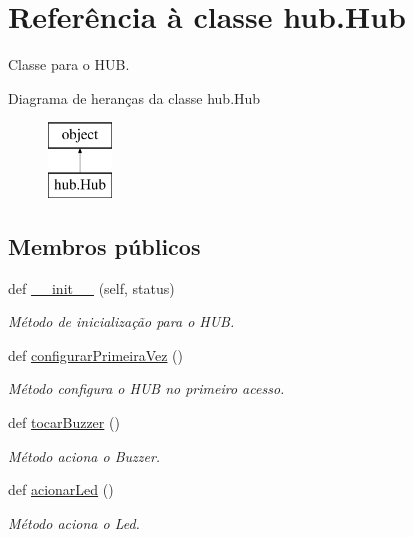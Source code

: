 \hypertarget{classhub_1_1_hub}{}\section{Referência à classe hub.\+Hub}
\label{classhub_1_1_hub}


Classe para o H\+UB.  


Diagrama de heranças da classe hub.\+Hub\begin{figure}[H]
\begin{center}
\leavevmode
\includegraphics[height=2.000000cm]{classhub_1_1_hub}
\end{center}
\end{figure}
\subsection*{Membros públicos}
\begin{DoxyCompactItemize}
\item 
def \hyperlink{classhub_1_1_hub_a6927b78580ea47e1525a945e7d1da004}{\+\_\+\+\_\+init\+\_\+\+\_\+} (self, status)
\begin{DoxyCompactList}\small\item\em Método de inicialização para o H\+UB. \end{DoxyCompactList}\item 
def \hyperlink{classhub_1_1_hub_aa41079065dfa6828808c061629f70b68}{configurar\+Primeira\+Vez} ()
\begin{DoxyCompactList}\small\item\em Método configura o H\+UB no primeiro acesso. \end{DoxyCompactList}\item 
def \hyperlink{classhub_1_1_hub_ad440e34d328f4dc716307d5578594a9b}{tocar\+Buzzer} ()
\begin{DoxyCompactList}\small\item\em Método aciona o Buzzer. \end{DoxyCompactList}\item 
def \hyperlink{classhub_1_1_hub_adfaed7c1b066104b83f4785c16b19496}{acionar\+Led} ()
\begin{DoxyCompactList}\small\item\em Método aciona o Led. \end{DoxyCompactList}\end{DoxyCompactItemize}
